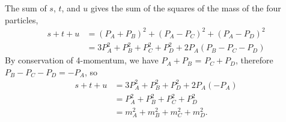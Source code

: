 The sum of $s$, $t$, and $u$ gives the sum of the squares of the mass of the four particles,
\begin{align}
s +t + u &= (P_A + P_B)^2 + (P_A - P_C)^2 + (P_A - P_D)^2 \\
&= 3P_A^2 + P_B^2 + P_C^2 + P_D^2 + 2P_A(P_B - P_C - P_D)
\end{align}
By conservation of 4-momentum, we have $P_A + P_B$ = $P_C + P_D$, therefore $P_B - P_C - P_D = -P_A$, so
\begin{align}
s + t + u &= 3P_A^2 + P_B^2 + P_D^2 + 2P_A(-P_A) \\
&= P_A^2 + P_B^2 + P_C^2 + P_D^2 \\
&= m_A^2 + m_B^2 + m_C^2 + m_D^2. \label{eq:madelstamSum}
\end{align}
